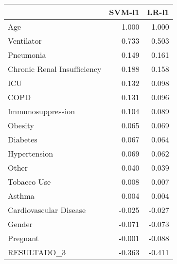 \begin{tabular}{lrr}
\toprule
{} &  SVM-l1 &  LR-l1 \\
\midrule
Age                         &   1.000 &  1.000 \\
Ventilator                  &   0.733 &  0.503 \\
Pneumonia                   &   0.149 &  0.161 \\
Chronic Renal Insufficiency &   0.188 &  0.158 \\
ICU                         &   0.132 &  0.098 \\
COPD                        &   0.131 &  0.096 \\
Immunosuppression           &   0.104 &  0.089 \\
Obesity                     &   0.065 &  0.069 \\
Diabetes                    &   0.067 &  0.064 \\
Hypertension                &   0.069 &  0.062 \\
Other                       &   0.040 &  0.039 \\
Tobacco Use                 &   0.008 &  0.007 \\
Asthma                      &   0.004 &  0.004 \\
Cardiovascular Disease      &  -0.025 & -0.027 \\
Gender                      &  -0.071 & -0.073 \\
Pregnant                    &  -0.001 & -0.088 \\
RESULTADO\_3                 &  -0.363 & -0.411 \\
\bottomrule
\end{tabular}
